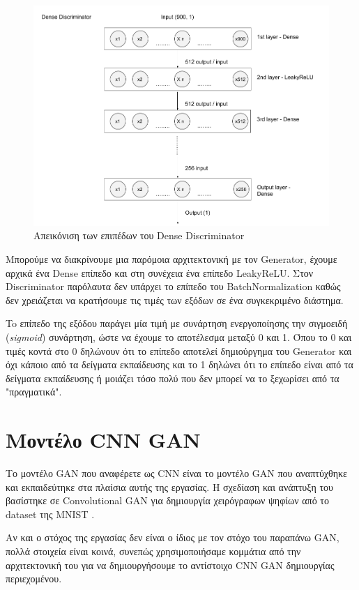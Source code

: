 \begin{figure}[H]
\centering
\includegraphics[width=.8\linewidth]{../images/graphs/Dense_discriminator.png}
\caption{Απεικόνιση των επιπέδων του Dense Discriminator}
\label{fig:fig}
\end{figure}

\par
Μπορούμε να διακρίνουμε μια παρόμοια αρχιτεκτονική με τον Generator, έχουμε αρχικά ένα Dense επίπεδο και στη συνέχεια ένα επίπεδο LeakyReLU. Στον Discriminator παρόλαυτα δεν υπάρχει το επίπεδο του BatchNormalization καθώς δεν χρειάζεται να κρατήσουμε τις τιμές των εξόδων σε ένα συγκεκριμένο διάστημα.
\par
To επίπεδο της εξόδου παράγει μία τιμή με συνάρτηση ενεργοποίησης την σιγμοειδή (\textit{sigmoid}) συνάρτηση, ώστε να έχουμε το αποτέλεσμα μεταξύ 0 και 1. Όπου το 0 και τιμές κοντά στο 0 δηλώνουν ότι το επίπεδο αποτελεί δημιούργημα του Generator και όχι κάποιο από τα δείγματα εκπαίδευσης και το 1 δηλώνει ότι το επίπεδο είναι από τα δείγματα εκπαίδευσης ή μοιάζει τόσο πολύ που δεν μπορεί να το ξεχωρίσει από τα "πραγματικά".

\section{Μοντέλο CNN GAN}

Το μοντέλο GAN που αναφέρετε ως CNN είναι το μοντέλο GAN που αναπτύχθηκε και εκπαιδεύτηκε στα πλαίσια αυτής της εργασίας. Η σχεδίαση και ανάπτυξη του βασίστηκε σε Convolutional GAN για δημιουργία χειρόγραφων ψηφίων από το dataset της MNIST \cite{mnist}. 
\par
Αν και ο στόχος της εργασίας δεν είναι ο ίδιος με τον στόχο του παραπάνω GAN, πολλά στοιχεία είναι κοινά, συνεπώς χρησιμοποιήσαμε κομμάτια από την αρχιτεκτονική του για να δημιουργήσουμε το αντίστοιχο CNN GAN δημιουργίας περιεχομένου.

